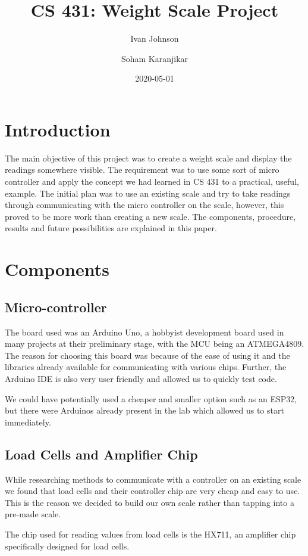 \documentclass[10pt]{article}
\title{CS 431: Weight Scale Project}
\author{Ivan Johnson \and Soham Karanjikar}
\date{2020-05-01}
\begin{document}
\maketitle

\newpage
\section{Introduction}
The main objective of this project was to create a weight scale and display the readings somewhere visible. The requirement was to use some sort of micro controller and apply the concept we had learned in CS 431 to a practical, useful, example. The initial plan was to use an existing scale and try to take readings through communicating with the micro controller on the scale, however, this proved to be more work than creating a new scale. The components, procedure, results and future possibilities are explained in this paper.


\section{Components}
\subsection{Micro-controller}
The board used was an Arduino Uno, a hobbyist development board used in many projects at their preliminary stage, with the MCU being an ATMEGA4809. The reason for choosing this board was because of the ease of using it and the libraries already available for communicating with various chips. Further, the Arduino IDE is also very user friendly and allowed us to quickly test code.

We could have potentially used a cheaper and smaller option such as an ESP32, but there were Arduinos already present in the lab which allowed us to start immediately.

\subsection{Load Cells and Amplifier Chip}
While researching methods to communicate with a controller on an existing scale we found that load cells and their controller chip are very cheap and easy to use. This is the reason we decided to build our own scale rather than tapping into a pre-made scale.

The chip used for reading values from load cells is the HX711, an amplifier chip specifically designed for load cells.
\end{document}
